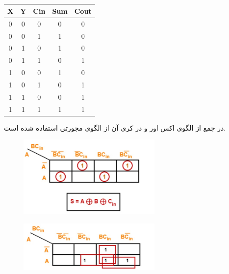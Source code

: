 \documentclass[20pt, a4paper]{article}
\begin{document}
\newpage
\subsection{}

\begin{LTR}
	\begin{tabular}{ c c c | c | c }
		X & Y & Cin & Sum & Cout \\
		\hline
		0 & 0 & 0 &  0 &  0\\ 				
		0 & 0 & 1 &  1 &  0\\
		0 & 1 & 0 &  1 &  0\\
		0 & 1 & 1 &  0 &  1\\
		1 & 0 & 0 &  1 &  0\\
		1 & 0 & 1 &  0 &  1\\
		1 & 1 & 0 &  0 &  1\\
		1 & 1 & 1 &  1 &  1\\	
	\end{tabular}
\end{LTR}
\hfill \break

در جمع
از الگوی اکس اور و در کری آن از الگوی مجورتی استفاده شده است.
\begin{figure}[htbp]\centering
	\centerline{\includegraphics[width=200pt]{img/lastest/fullAdderXor.jpg}}
\end{figure}

\begin{figure}[htbp]\centering
	\centerline{\includegraphics[width=200pt]{img/lastest/fullAdderMajority.jpg}}
\end{figure}
\newpage
\end{document}
